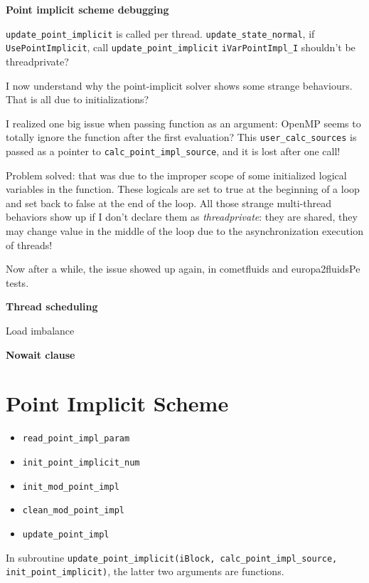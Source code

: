 \documentclass[11pt]{book} %
\begin{document}
\textbf{Point implicit scheme debugging}

\verb|update_point_implicit| is called per thread.
\verb|update_state_normal|, if \verb|UsePointImplicit|, call \verb|update_point_implicit|
\verb|iVarPointImpl_I| shouldn't be threadprivate?

I now understand why the point-implicit solver shows some strange behaviours. That is all due to initializations?

I realized one big issue when passing function as an argument: OpenMP seems to totally ignore the function after the first evaluation? This \verb|user_calc_sources| is passed as a pointer to \verb|calc_point_impl_source|, and it is lost after one call!

Problem solved: that was due to the improper scope of some initialized logical variables in the function.
These logicals are set to true at the beginning of a loop and set back to false at the end of the loop. All those strange multi-thread behaviors show up if I don't declare them as \emph{threadprivate}: they are shared, they may change value in the middle of the loop due to the asynchronization execution of threads!

Now after a while, the issue showed up again, in cometfluids and europa2fluidsPe tests.

\textbf{Thread scheduling}

Load imbalance

\textbf{Nowait clause}


\section{Point Implicit Scheme}
\begin{itemize}
\item \verb|read_point_impl_param|
\item \verb|init_point_implicit_num|
\item \verb|init_mod_point_impl|
\item \verb|clean_mod_point_impl|
\item \verb|update_point_impl|
\end{itemize}

In subroutine \verb|update_point_implicit(iBlock, calc_point_impl_source, init_point_implicit)|, the latter two arguments are functions.
\end{document}
